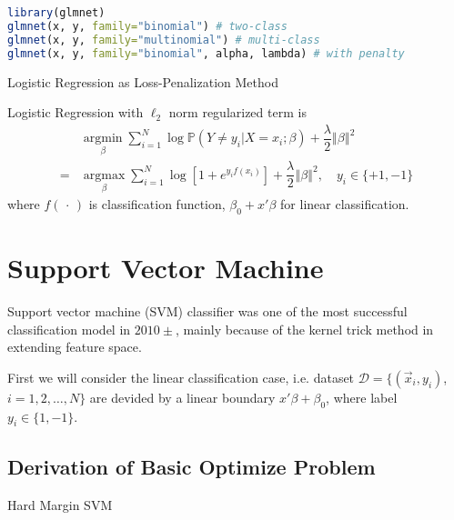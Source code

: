 \begin{rcode}
\begin{lstlisting}[language=R]
library(glmnet)
glmnet(x, y, family="binomial") # two-class 
glmnet(x, y, family="multinomial") # multi-class
glmnet(x, y, family="binomial", alpha, lambda) # with penalty
\end{lstlisting}
\end{rcode}

\begin{point}
    Logistic Regression as Loss-Penalization Method
\end{point}

    Logistic Regression with $ \ell_2 $ norm regularized term is
    \begin{align}
         &\mathop{\arg\min}\limits_{\beta }\sum_{i=1}^N\log \mathbb{P}\left( Y\neq y_i|X=x_i;\beta  \right)+\dfrac{\lambda }{2}\left\Vert \beta  \right\Vert ^2\\
         =&\mathop{\arg\max}\limits_{\beta }\sum_{i=1}^N\log [1+e^{y_if(x_i)}]+\dfrac{\lambda }{2}\left\Vert \beta  \right\Vert ^2   ,\quad y_i\in\{+1,-1\}    
    \end{align}
    where $ f(\,\cdot\,) $ is classification function, $ \beta _0+x'\beta  $ for linear classification. 
    
    



    



\section{Support Vector Machine}\label{SubSectionSupportVectorMachine}
    Support vector machine (SVM) classifier was one of the most successful classification model in $ 2010\pm $, mainly because of the kernel trick method in extending feature space.

    First we will consider the linear classification case, i.e. dataset $\mathcal{D}=\{ (\vec{x}_i,y_i) $, $ i=1,2,\ldots,N \}$ are devided by a linear boundary $ x'\beta +\beta _0 $, where label $ y_i\in\{1,-1\} $.

\subsection{Derivation of Basic Optimize Problem}
\begin{point}
    Hard Margin SVM
\end{point}


